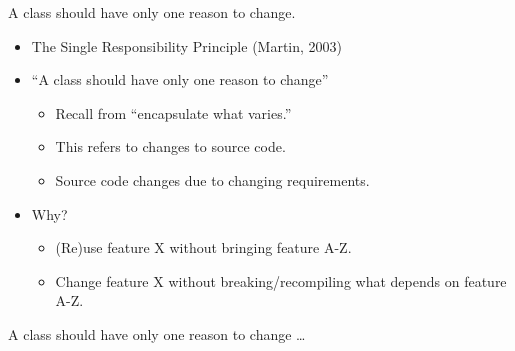 \documentclass{beamer}
\begin{document}
\begin{frame}{A class should have only one reason to change.}
    \begin{itemize}
        \item The Single Responsibility Principle (Martin, 2003)
        \item ``A class should have only one reason to change''
        \begin{itemize}
            \item Recall from ``encapsulate what varies.''
            \item This refers to changes to source code.
            \item Source code changes due to changing requirements.
        \end{itemize}
    \item Why? 
        \begin{itemize}
            \item (Re)use feature X without bringing feature A-Z.
            \item Change feature X without breaking/recompiling what depends on feature A-Z.
        \end{itemize}
    \end{itemize}
\end{frame}

\begin{frame}{A class should have only one reason to change \ldots}
    \vspace{0cm}
    \begin{columns}
        \column{\dimexpr\paperwidth-40pt}
        
    \end{columns}
\end{frame}
\end{document}
